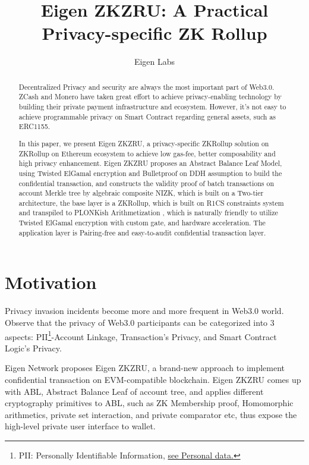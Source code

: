 \documentclass{article}
\title{Eigen ZKZRU: A Practical Privacy-specific ZK Rollup}
\author{Eigen Labs}
\begin{document}
\maketitle

\begin{abstract}
Decentralized Privacy and security are always the most important part of Web3.0. ZCash and Monero have taken great effort to achieve privacy-enabling technology by building their private payment infrastructure and ecosystem. However, it's not easy to achieve programmable privacy on Smart Contract regarding general assets, such as ERC1155.

In this paper, we present Eigen ZKZRU, a privacy-specific ZKRollup solution on ZKRollup on Ethereum ecosystem to achieve low gas-fee, better composability and high privacy enhancement. Eigen ZKZRU proposes an Abstract Balance Leaf Model, using Twisted ElGamal encryption \cite{chen2020pgc} and Bulletproof \cite{bunz2018bulletproofs} on DDH assumption to build the confidential transaction, and constructs the validity proof of batch transactions on account Merkle tree by algebraic composite NIZK, which is built on a Two-tier architecture, the base layer is a ZKRollup, which is built on R1CS constraints system and transpiled to PLONKish Arithmetization \cite{gabizon2019plonk}, which is naturally friendly to utilize Twisted ElGamal encryption with custom gate, and hardware acceleration. The application layer is Pairing-free and easy-to-audit confidential transaction layer. 


\end{abstract}

\section{Motivation}

Privacy invasion incidents become more and more frequent in Web3.0 world. Observe that the privacy of Web3.0 participants can be categorized into 3 aspects: PII\footnote{PII: Personally Identifiable Information, \href{https://en.wikipedia.org/wiki/Personal_data}{see Personal data.}}-Account Linkage, Transaction's Privacy, and Smart Contract Logic's Privacy.

Eigen Network proposes Eigen ZKZRU, a brand-new approach to implement confidential transaction on EVM-compatible blockchain. Eigen ZKZRU comes up with ABL, Abstract Balance Leaf of account tree, and applies different cryptography primitives to ABL, such as ZK Membership proof, Homomorphic arithmetics, private set interaction, and private comparator etc, thus expose the high-level private user interface to wallet. 
\end{document}
